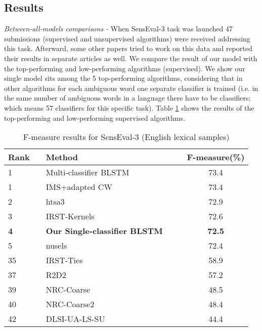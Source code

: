 \documentclass{llncs}
\begin{document}
\subsection{Results}
\textit{Between-all-models comparisons - }When SensEval-3 task was launched 47 submissions (supervised and unsupervised algorithms) were received addressing this task. Afterward, some other papers tried to work on this data and reported their results in separate articles as well. We compare the result of our model with the top-performing and low-performing algorithms (supervised). We show our single model sits among the 5 top-performing algorithms, considering that in other algorithms for each ambiguous word one separate classifier is trained (i.e. in the same number of ambiguous words in a language there have to be classifiers; which means 57 classifiers for this specific task). Table \ref{table:between-all-models-comparisons} shows the results of the top-performing and low-performing supervised algorithms.
\begin{table}[]
	\centering
	\caption{F-measure results for SensEval-3 (English lexical samples)}
	\label{table:between-all-models-comparisons}
	\begin{tabular}{@{}lllllc@{}}
		\toprule
		\textbf{Rank} &  & \textbf{Method}                 &  &  & \textbf{F-measure(\%)} \\ \midrule
		1             &  & Multi-classifier BLSTM \cite{kaageback2016word}       &  &  & 73.4               \\
		1             &  & IMS+adapted CW \cite{taghipour2015semi}             &  &  & 73.4               \\
		2             &  & htsa3 \cite{grozea2004finding}                   &  &  & 72.9               \\
		3             &  & IRST-Kernels \cite{strapparava2004pattern}              &  &  & 72.6               \\
		\textbf{4}    &  & \textbf{Our Single-classifier BLSTM} &  &  & \textbf{72.5}      \\
		5             &  & nusels \cite{lee2004supervised}                      &  &  & 72.4               \\ \midrule
		35            &  & IRST-Ties                    &  &  & 58.9               \\
		37            &  & R2D2                         &  &  & 57.2               \\
		39            &  & NRC-Coarse                   &  &  & 48.5               \\
		40            &  & NRC-Coarse2                  &  &  & 48.4               \\
		42            &  & DLSI-UA-LS-SU                &  &  & 44.4               \\ \bottomrule
	\end{tabular}
\end{table}
\end{document}

